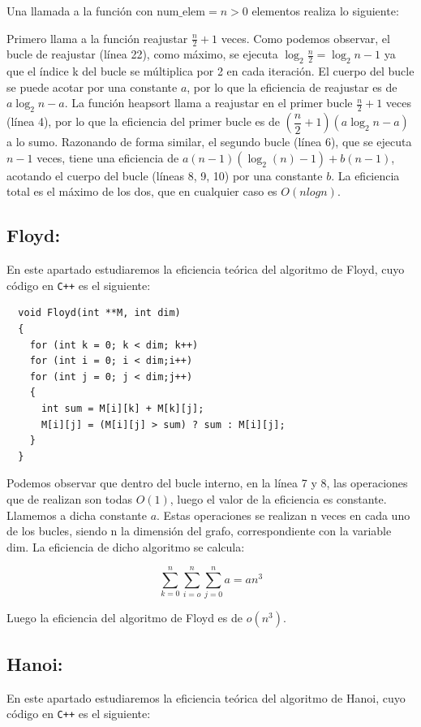 \documentclass{article}
\begin{document}
\begin{flushleft}
  Una llamada a la función con $\text{num\_elem} = n > 0$ elementos
  realiza lo siguiente:

  Primero llama a la función reajustar $\frac{n}{2}+1$ veces. Como
  podemos observar, el bucle de reajustar (línea 22), como máximo, se
  ejecuta $\log_2\frac{n}{2}= \log_2n-1$ ya que el índice k del bucle
  se múltiplica por 2 en cada iteración. El cuerpo del bucle se puede
  acotar por una constante $a$, por lo que la eficiencia de reajustar
  es de $a\log_2n-a$. La función heapsort llama a reajustar en el
  primer bucle $\frac{n}{2}+1$ veces (línea 4), por lo que la
  eficiencia del primer bucle es de $(\dfrac{n}{2}+1)(a\log_2n-a)$ a
  lo sumo. Razonando de forma similar, el segundo bucle (línea 6), que
  se ejecuta $n-1$ veces, tiene una eficiencia de
  $a(n-1)(\log_2(n)-1)+b(n-1)$, acotando el cuerpo del bucle (líneas
  8, 9, 10) por una constante $b$. La eficiencia total es el máximo de
  los dos, que en cualquier caso es $O(nlog n)$.
\end{flushleft}

\subsection{Floyd:}

En este apartado estudiaremos la eficiencia teórica del algoritmo de Floyd, cuyo código en \verb-C++- es el siguiente: 

\begin{lstlisting}
  void Floyd(int **M, int dim)
  {
    for (int k = 0; k < dim; k++)
    for (int i = 0; i < dim;i++)
    for (int j = 0; j < dim;j++)
    {
      int sum = M[i][k] + M[k][j];    	
      M[i][j] = (M[i][j] > sum) ? sum : M[i][j];
    }
  }
\end{lstlisting}

Podemos observar que dentro del bucle interno, en la línea 7 y 8, las operaciones que de realizan son todas $O(1)$, luego el valor de la eficiencia es constante. Llamemos a dicha constante $a$.
Estas operaciones se realizan n veces en cada uno de los bucles, siendo n la dimensión del grafo, correspondiente con la variable dim. La eficiencia de dicho algoritmo se calcula:

$$\sum\limits_{k=0}^n\sum\limits_{i=o}^n\sum\limits_{j=0}^na=an^3$$

Luego la eficiencia del algoritmo de Floyd es de $o(n^3)$.

\subsection{Hanoi:}
En este apartado estudiaremos la eficiencia teórica del algoritmo de Hanoi, cuyo código en \verb-C++- es el siguiente: 
\end{document}
